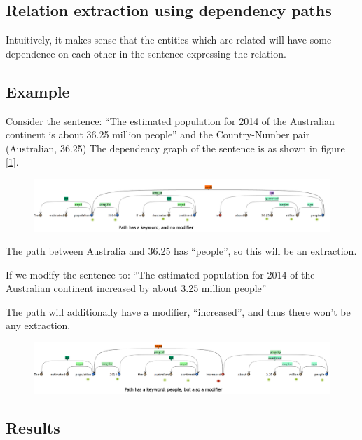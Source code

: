 \documentclass[a4paper,10pt]{article}
\begin{document}
\subsection{Relation extraction using dependency paths}
Intuitively, it makes sense that the entities which are related will have some dependence on each other in the sentence 
expressing the relation.


\subsection{Example}
Consider the sentence:
``The estimated population for 2014 of the Australian continent	is about 36.25 million people''
and the Country-Number pair (Australian, 36.25)
The dependency graph of the sentence is as shown in figure [\ref{pos}].
\begin{figure}[h]
 \centering
 \includegraphics[bb=0 0 1292 228,scale=0.3]{./dep_pos.png}
 \label{pos}
\end{figure}
The path between Australia and 36.25 has ``people'', so this will be an extraction.

If we modify the sentence to:
``The estimated population for 2014 of the Australian continent	increased by about 3.25 million people''

The path will additionally have a modifier, ``increased'', and thus there won't be any extraction.
\begin{figure}[h]
 \centering
 \includegraphics[bb=0 0 1292 228,scale=0.3]{./dep_neg.png}
 \label{neg}
\end{figure}




\subsection{Results}
\end{document}
